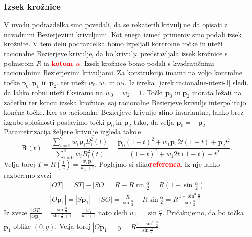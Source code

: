 \documentclass[isrm2, tisk]{fmfdelo}
\newcommand{\p}{\mathbf{p}}
\newcommand{\mycomment}[1]{\textbf{\textcolor{red}{#1}}}
\begin{document}
    \subsubsection{Izsek krožnice}
    V uvodu podrazdelka smo povedali, da se nekaterih krivulj ne da opisati z navadnimi Bezierjevimi krivuljami.
    Kot enega izmed primerov smo podali izsek krožnice.
    V tem delu podrazdelka bomo izpeljali kontrolne točke in uteži racionalne Bezierjeve krivulje, da bo krivulja predstavljala izsek krožnice s polmerom $R$ in \mycomment{kotom $\alpha$}.
    Izsek krožnice bomo podali s kvadratičnimi racionalnimi Bezierjevimi krivuljami.
    Za konstrukcijo imamo na voljo kontrolne točke $\p_0,\p_1$ in $\p_2$, ter uteži $w_0,w_1$ in $w_2$.
    Iz izreka~\ref{izrek:racionalne-utezi-1} sledi, da lahko robni uteži fiksiramo na $w_0=w_2=1$.
    Točki $\p_0$ in $\p_2$ morata ležati na začetku ter koncu izseka krožnice, saj racionalne Bezierjeve krivulje interpolirajo končne točke.
    Ker so racionalne Bezierjeve krivulje afino invariantne, lahko brez izgube splošnosti postavimo točki $\p_0$ in $\p_2$ tako, da velja $\p_0=-\p_2$.
    Parametrizacija željene krivulje izgleda takole
    \[\mathbf{R}(t) = \frac{\sum^{2}_{i=0}w_i\p_i B^2_i(t)}{\sum^{2}_{i=0}w_i B^2_i(t)} = \frac{\p_0 (1-t)^2 + w_1\p_1 2t(1-t) + \p_2 t^2}{(1-t)^2 + w_1 2t(1-t) + t^2}.\]
    Velja torej $T=R(\frac{1}{2})= \frac{w_1\p_1}{w_1+1}$.
    Poglejmo si sliko\mycomment{referenca}.
    Iz nje lahko razberemo zvezi
    \begin{align*}
        |OT|=|ST|-|SO| = R - R\sin\frac{\alpha}{2} = R(1-\sin\frac{\alpha}{2})\\
        |O\p_1| = |S\p_1|-|SO| = \frac{R}{\sin\frac{\alpha}{2}} - R\sin\frac{\alpha}{2} = R\frac{1-\sin^2\frac{\alpha}{2}}{\sin\frac{\alpha}{2}}
    \end{align*}
    Iz zveze $\frac{|OT|}{|O\p_1|} = \frac{\sin\frac{\alpha}{2}}{\sin\frac{\alpha}{2}+1} = \frac{w_1}{w_1+1}$ nato sledi $w_1=\sin\frac{\alpha}{2}$.
    Pričakujemo, da bo točka $\p_1$ oblike $(0,y)$.
    Velja torej $|O\p_1|=y=R\frac{1-\sin^2\frac{\alpha}{2}}{\sin\frac{\alpha}{2}}$.
\end{document}
